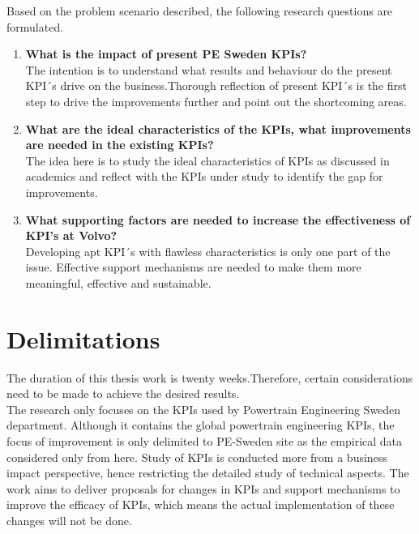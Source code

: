 Based on the problem scenario described, the following research questions are formulated.\\

\begin{enumerate}
    \item \textbf{What is the impact of present PE Sweden KPIs?}\\
    The intention is to understand what results and behaviour do the present KPI´s drive on the business.Thorough reflection of present KPI´s is the first step to drive the improvements further and point out the shortcoming areas.\\

    \item \textbf{What are the ideal characteristics of the KPIs, what improvements are needed in the existing KPIs?}\\
    The idea here is to study the ideal characteristics of KPIs as discussed in academics and reflect with the KPIs under study to identify the gap for improvements. \\

    \item \textbf{What supporting factors are needed to increase the effectiveness of KPI’s at Volvo?}\\
    Developing apt KPI´s with flawless characteristics is only one part of the issue. Effective support mechanisms are needed to make them more meaningful, effective and sustainable.\\
  \end{enumerate}
\section{Delimitations}
The duration of this thesis work is twenty weeks.Therefore, certain considerations need to be made to achieve the desired results. \\ 

The research only focuses on the KPIs used by Powertrain Engineering Sweden department. Although it contains the global powertrain engineering KPIs, the focus of improvement is only delimited to PE-Sweden site as the empirical data considered only from here. Study of KPIs is conducted more from a business impact perspective, hence restricting the detailed study of technical aspects. The work aims to deliver proposals for changes in KPIs and support mechanisms to improve the efficacy of KPIs, which means the actual implementation of these changes will not be done.\\
